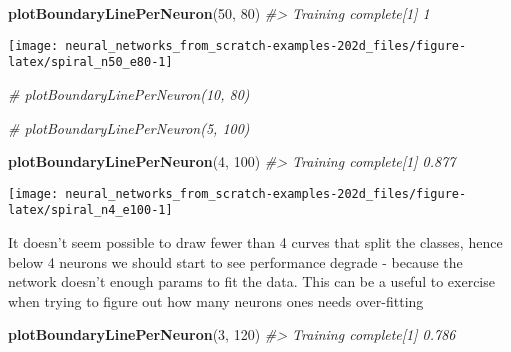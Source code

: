 \documentclass[]{book}
\newenvironment{Shaded}{\begin{snugshade}}{\end{snugshade}}
\newcommand{\CommentTok}[1]{\textcolor[rgb]{0.56,0.35,0.01}{\textit{#1}}}
\newcommand{\DecValTok}[1]{\textcolor[rgb]{0.00,0.00,0.81}{#1}}
\newcommand{\KeywordTok}[1]{\textcolor[rgb]{0.13,0.29,0.53}{\textbf{#1}}}
\newcommand{\NormalTok}[1]{#1}
\begin{document}
\begin{Shaded}
\begin{Highlighting}[]
 \KeywordTok{plotBoundaryLinePerNeuron}\NormalTok{(}\DecValTok{50}\NormalTok{, }\DecValTok{80}\NormalTok{)}
\CommentTok{#> Training complete[1] 1}
\end{Highlighting}
\end{Shaded}

\begin{center}\texttt{[image: neural\_networks\_from\_scratch-examples-202d\_files/figure-latex/spiral\_n50\_e80-1]} \end{center}

\begin{Shaded}
\begin{Highlighting}[]
\CommentTok{# plotBoundaryLinePerNeuron(10, 80)}
\end{Highlighting}
\end{Shaded}

\begin{Shaded}
\begin{Highlighting}[]
\CommentTok{# plotBoundaryLinePerNeuron(5, 100)}
\end{Highlighting}
\end{Shaded}

\begin{Shaded}
\begin{Highlighting}[]
 \KeywordTok{plotBoundaryLinePerNeuron}\NormalTok{(}\DecValTok{4}\NormalTok{, }\DecValTok{100}\NormalTok{)}
\CommentTok{#> Training complete[1] 0.877}
\end{Highlighting}
\end{Shaded}

\begin{center}\texttt{[image: neural\_networks\_from\_scratch-examples-202d\_files/figure-latex/spiral\_n4\_e100-1]} \end{center}

It doesn't seem possible to draw fewer than 4 curves that split the classes, hence below 4 neurons we should start to see performance degrade - because the network doesn't enough params to fit the data. This can be a useful to exercise when trying to figure out how many neurons ones needs over-fitting

\begin{Shaded}
\begin{Highlighting}[]
 \KeywordTok{plotBoundaryLinePerNeuron}\NormalTok{(}\DecValTok{3}\NormalTok{, }\DecValTok{120}\NormalTok{)}
\CommentTok{#> Training complete[1] 0.786}
\end{Highlighting}
\end{Shaded}
\end{document}
